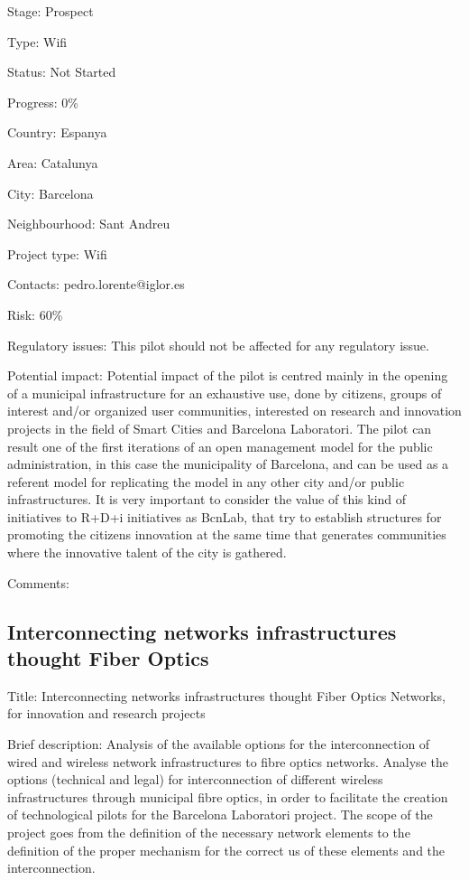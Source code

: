 \documentclass[draftclsnofoot,12pt,journal,onecolumn]{IEEEtran}
\begin{document}
Stage: Prospect 

Type: Wifi 

Status: Not Started 

Progress: 0\% 

Country: Espanya 

Area: Catalunya 

City: Barcelona 

Neighbourhood: Sant Andreu 

Project type: Wifi 

Contacts: pedro.lorente@iglor.es

Risk: 60\% 

Regulatory issues: This pilot should not be affected for any regulatory 
issue. 

Potential impact: 
Potential impact of the pilot is centred mainly in the opening of a municipal 
infrastructure for an exhaustive use, done by citizens, groups of interest 
and/or organized user communities, interested on research and innovation 
projects in the field of Smart Cities and Barcelona Laboratori. 
The pilot can result one of the first iterations of an open management model 
for the public administration, in this case the municipality of Barcelona, 
and can be used as a referent model for replicating the model in any other 
city and/or public infrastructures. 
It is very important to consider the value of this kind of initiatives to 
R+D+i initiatives as BcnLab, that try to establish structures for promoting 
the citizens innovation at the same time that generates communities where the 
innovative talent of the city is gathered. 

Comments: 

\subsection{Interconnecting networks infrastructures thought Fiber Optics} 

Title: Interconnecting networks infrastructures thought Fiber Optics 
Networks, for innovation and research projects 

Brief description: Analysis of the available options for the interconnection 
of wired and wireless network infrastructures to fibre optics networks. 
Analyse the options (technical and legal) for interconnection of different 
wireless infrastructures through municipal fibre optics, in order to 
facilitate the creation of technological pilots for the Barcelona Laboratori 
project. The scope of the project goes from the definition of the necessary 
network elements to the definition of the proper mechanism for the correct us 
of these elements and the interconnection. 
\end{document}
